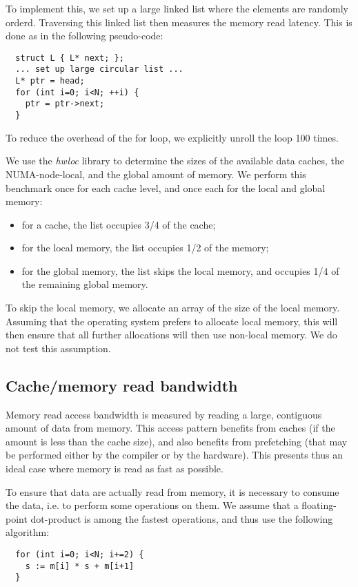 To implement this, we set up a large linked list where the elements
are randomly orderd. Traversing this linked list then measures the
memory read latency. This is done as in the following pseudo-code:
\begin{verbatim}
  struct L { L* next; };
  ... set up large circular list ...
  L* ptr = head;
  for (int i=0; i<N; ++i) {
    ptr = ptr->next;
  }
\end{verbatim}

To reduce the overhead of the for loop, we explicitly unroll the loop
100 times.

\label{sec:sizes}
We use the \emph{hwloc} library to determine the sizes of the
available data caches, the NUMA-node-local, and the global amount of
memory. We perform this benchmark once for each cache level, and once
each for the local and global memory:
\begin{itemize}
\item for a cache, the list occupies 3/4 of the cache;
\item for the local memory, the list occupies 1/2 of the memory;
\item for the global memory, the list skips the local memory, and
  occupies 1/4 of the remaining global memory.
\end{itemize}

To skip the local memory, we allocate an array of the size of the
local memory. Assuming that the operating system prefers to allocate
local memory, this will then ensure that all further allocations will
then use non-local memory. We do not test this assumption.

\subsection{Cache/memory read bandwidth}

Memory read access bandwidth is measured by reading a large,
contiguous amount of data from memory. This access pattern benefits
from caches (if the amount is less than the cache size), and also
benefits from prefetching (that may be performed either by the
compiler or by the hardware). This presents thus an ideal case where
memory is read as fast as possible.

To ensure that data are actually read from memory, it is necessary to
consume the data, i.e. to perform some operations on them. We assume
that a floating-point dot-product is among the fastest operations, and
thus use the following algorithm:
\begin{verbatim}
  for (int i=0; i<N; i+=2) {
    s := m[i] * s + m[i+1]
  }
\end{verbatim}

